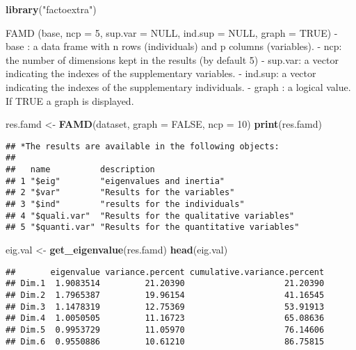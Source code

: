\documentclass[
]{article}
\newenvironment{Shaded}{\begin{snugshade}}{\end{snugshade}}
\newcommand{\DataTypeTok}[1]{\textcolor[rgb]{0.13,0.29,0.53}{#1}}
\newcommand{\DecValTok}[1]{\textcolor[rgb]{0.00,0.00,0.81}{#1}}
\newcommand{\KeywordTok}[1]{\textcolor[rgb]{0.13,0.29,0.53}{\textbf{#1}}}
\newcommand{\NormalTok}[1]{#1}
\newcommand{\OtherTok}[1]{\textcolor[rgb]{0.56,0.35,0.01}{#1}}
\newcommand{\StringTok}[1]{\textcolor[rgb]{0.31,0.60,0.02}{#1}}
\begin{document}
\begin{Shaded}
\begin{Highlighting}[]
\KeywordTok{library}\NormalTok{(}\StringTok{"factoextra"}\NormalTok{)}
\end{Highlighting}
\end{Shaded}

FAMD (base, ncp = 5, sup.var = NULL, ind.sup = NULL, graph = TRUE) -
base : a data frame with n rows (individuals) and p columns (variables).
- ncp: the number of dimensions kept in the results (by default 5) -
sup.var: a vector indicating the indexes of the supplementary variables.
- ind.sup: a vector indicating the indexes of the supplementary
individuals. - graph : a logical value. If TRUE a graph is displayed.

\begin{Shaded}
\begin{Highlighting}[]
\NormalTok{res.famd <-}\StringTok{ }\KeywordTok{FAMD}\NormalTok{(dataset, }\DataTypeTok{graph =} \OtherTok{FALSE}\NormalTok{, }\DataTypeTok{ncp =} \DecValTok{10}\NormalTok{)}
\KeywordTok{print}\NormalTok{(res.famd)}
\end{Highlighting}
\end{Shaded}

\begin{verbatim}
## *The results are available in the following objects:
## 
##   name          description                             
## 1 "$eig"        "eigenvalues and inertia"               
## 2 "$var"        "Results for the variables"             
## 3 "$ind"        "results for the individuals"           
## 4 "$quali.var"  "Results for the qualitative variables" 
## 5 "$quanti.var" "Results for the quantitative variables"
\end{verbatim}

\begin{Shaded}
\begin{Highlighting}[]
\NormalTok{eig.val <-}\StringTok{ }\KeywordTok{get_eigenvalue}\NormalTok{(res.famd)}
\KeywordTok{head}\NormalTok{(eig.val)}
\end{Highlighting}
\end{Shaded}

\begin{verbatim}
##       eigenvalue variance.percent cumulative.variance.percent
## Dim.1  1.9083514         21.20390                    21.20390
## Dim.2  1.7965387         19.96154                    41.16545
## Dim.3  1.1478319         12.75369                    53.91913
## Dim.4  1.0050505         11.16723                    65.08636
## Dim.5  0.9953729         11.05970                    76.14606
## Dim.6  0.9550886         10.61210                    86.75815
\end{verbatim}
\end{document}
